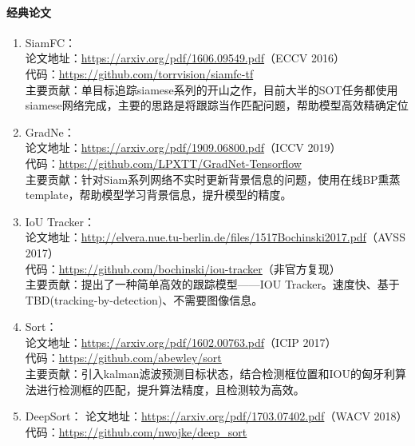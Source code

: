 \documentclass[lang=cn,11pt,a4paper]{elegant_template}
\begin{document}
\paragraph{经典论文}
\begin{enumerate}
    \item SiamFC：\\
    论文地址：\href{https://arxiv.org/pdf/1606.09549.pdf}{https://arxiv.org/pdf/1606.09549.pdf}（ECCV 2016） \\
    代码：\href{https://github.com/torrvision/siamfc-tf}{https://github.com/torrvision/siamfc-tf}  \\
    主要贡献：单目标追踪siamese系列的开山之作，目前大半的SOT任务都使用siamese网络完成，主要的思路是将跟踪当作匹配问题，帮助模型高效精确定位
    \item GradNe：\\
    论文地址：\href{https://arxiv.org/pdf/1909.06800.pdf}{https://arxiv.org/pdf/1909.06800.pdf}（ICCV 2019） \\
    代码：\href{https://github.com/LPXTT/GradNet-Tensorflow}{https://github.com/LPXTT/GradNet-Tensorflow}  \\
    主要贡献：针对Siam系列网络不实时更新背景信息的问题，使用在线BP熏蒸template，帮助模型学习背景信息，提升模型的精度。
    \item IoU Tracker：\\
    论文地址：\href{http://elvera.nue.tu-berlin.de/files/1517Bochinski2017.pdf}{http://elvera.nue.tu-berlin.de/files/1517Bochinski2017.pdf}（AVSS 2017） \\
    代码：\href{https://github.com/bochinski/iou-tracker}{https://github.com/bochinski/iou-tracker}（非官方复现） \\
    主要贡献：提出了一种简单高效的跟踪模型——IOU Tracker。速度快、基于TBD(tracking-by-detection)、不需要图像信息。
    \item Sort：\\
    论文地址：\href{https://arxiv.org/pdf/1602.00763.pdf}{https://arxiv.org/pdf/1602.00763.pdf}（ICIP 2017） \\
    代码：\href{https://github.com/abewley/sort}{https://github.com/abewley/sort} \\
    主要贡献：引入kalman滤波预测目标状态，结合检测框位置和IOU的匈牙利算法进行检测框的匹配，提升算法精度，且检测较为高效。
    \item DeepSort：
    论文地址：\href{https://arxiv.org/pdf/1703.07402.pdf}{https://arxiv.org/pdf/1703.07402.pdf}（WACV 2018）\\
    代码：\href{https://github.com/nwojke/deep_sort}{https://github.com/nwojke/deep\_sort} \\

\end{enumerate}
\end{document}
